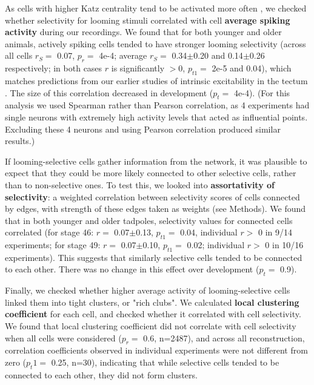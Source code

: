 \documentclass{article}
\begin{document}
As cells with higher Katz centrality tend to be activated more often \citep{fletcher2018katz}, we checked whether selectivity for looming stimuli correlated with cell \textbf{average spiking activity} during our recordings. We found that for both younger and older animals, actively spiking cells tended to have stronger looming selectivity (across all cells $r_S=$ 0.07, $p_r=$ 4e-4; average $r_S =$ 0.34$\pm$0.20 and 0.14$\pm$0.26 respectively; in both cases $r$ is significantly $>0$, $p_{t1}=$ 2e-5 and 0.04), which matches predictions from our earlier studies of intrinsic excitability in the tectum \citep{busch2019}. The size of this correlation decreased in development ($p_t=$ 4e-4). (For this analysis we used Spearman rather than Pearson correlation, as 4 experiments had single neurons with extremely high activity levels that acted as influential points. Excluding these 4 neurons and using Pearson correlation produced similar results.) 

If looming-selective cells gather information from the network, it was plausible to expect that they could be more likely connected to other selective cells, rather than to non-selective ones. To test this, we looked into \textbf{assortativity of selectivity}: a weighted correlation between selectivity scores of cells connected by edges, with strength of these edges taken as weights (see Methods). We found that in both younger and older tadpoles, selectivity values for connected cells correlated (for stage 46: $r=$ 0.07$\pm$0.13, $p_{t1}=$ 0.04, individual $r>$ 0 in 9/14 experiments; for stage 49: $r=$ 0.07$\pm$0.10, $p_{t1}=$ 0.02; individual $r>$ 0 in 10/16 experiments). This suggests that similarly selective cells tended to be connected to each other. There was no change in this effect over development ($p_t=$ 0.9).


Finally, we checked whether higher average activity of looming-selective cells linked them into tight clusters, or "rich clubs". We calculated \textbf{local clustering coefficient} for each cell, and checked whether it correlated with cell selectivity. We found that local clustering coefficient did not correlate with cell selectivity when all cells were considered ($p_r=$ 0.6, n=2487), and across all reconstruction, correlation coefficients observed in individual experiments were not different from zero ($p_t1=$ 0.25, n=30), indicating that while selective cells tended to be connected to each other, they did not form clusters.
\end{document}
